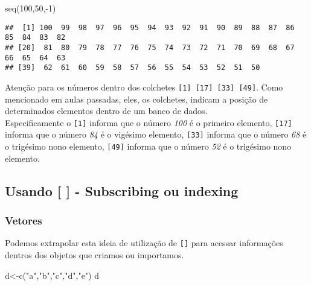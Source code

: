 \documentclass[
]{book}
\newenvironment{Shaded}{\begin{snugshade}}{\end{snugshade}}
\newcommand{\DecValTok}[1]{\textcolor[rgb]{0.00,0.00,0.81}{#1}}
\newcommand{\FunctionTok}[1]{\textcolor[rgb]{0.00,0.00,0.00}{#1}}
\newcommand{\NormalTok}[1]{#1}
\newcommand{\OtherTok}[1]{\textcolor[rgb]{0.56,0.35,0.01}{#1}}
\newcommand{\SpecialCharTok}[1]{\textcolor[rgb]{0.00,0.00,0.00}{#1}}
\newcommand{\StringTok}[1]{\textcolor[rgb]{0.31,0.60,0.02}{#1}}
\begin{document}
\begin{Shaded}
\begin{Highlighting}[]
\FunctionTok{seq}\NormalTok{(}\DecValTok{100}\NormalTok{,}\DecValTok{50}\NormalTok{,}\SpecialCharTok{{-}}\DecValTok{1}\NormalTok{)}
\end{Highlighting}
\end{Shaded}

\begin{verbatim}
##  [1] 100  99  98  97  96  95  94  93  92  91  90  89  88  87  86  85  84  83  82
## [20]  81  80  79  78  77  76  75  74  73  72  71  70  69  68  67  66  65  64  63
## [39]  62  61  60  59  58  57  56  55  54  53  52  51  50
\end{verbatim}

Atenção para os números dentro dos colchetes \texttt{{[}1{]}\ {[}17{]}\ {[}33{]}\ {[}49{]}}. Como mencionado em aulas passadas, eles, os colchetes, indicam a posição de determinados elementos dentro de um banco de dados.\\
Especificamente o \texttt{{[}1{]}} informa que o número \emph{100} é o primeiro elemento, \texttt{{[}17{]}} informa que o número \emph{84} é o vigésimo elemento, \texttt{{[}33{]}} informa que o número \emph{68} é o trigésimo nono elemento, \texttt{{[}49{]}} informa que o número \emph{52} é o trigésimo nono elemento.

\hypertarget{usando---subscribing-ou-indexing}{%
\subsection{Usando {[} {]} - Subscribing ou indexing}\label{usando---subscribing-ou-indexing}}

\hypertarget{vetores}{%
\subsubsection{Vetores}\label{vetores}}

Podemos extrapolar esta ideia de utilização de \texttt{{[}{]}} para acessar informações dentros dos objetos que criamos ou importamos.

\begin{Shaded}
\begin{Highlighting}[]
\NormalTok{d}\OtherTok{\textless{}{-}}\FunctionTok{c}\NormalTok{(}\StringTok{"a"}\NormalTok{,}\StringTok{"b"}\NormalTok{,}\StringTok{"c"}\NormalTok{,}\StringTok{"d"}\NormalTok{,}\StringTok{"e"}\NormalTok{)}
\NormalTok{d}
\end{Highlighting}
\end{Shaded}
\end{document}
